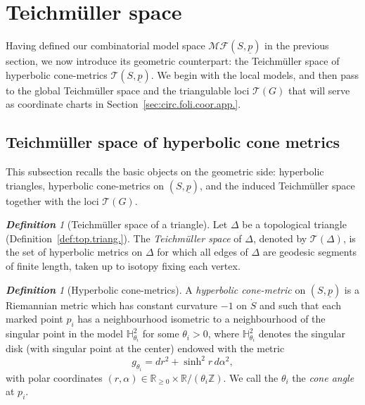 \documentclass[11pt, letterpaper]{amsart}
\theoremstyle{definition}
\theoremstyle{remark}
\newtheorem{definition}[theorem]{\rm\bf Definition}
\newcommand{\up}{\underline{p}}
\newcommand{\Sp}{(S,\up)}
\newcommand{\cMFp}{\mathcal{MF} (S,\up)}
\newcommand{\cT}{\mathcal{T}}
\newcommand{\cTp}{\mathcal{T} (S,\up)}
\newcommand{\bR}{\mathbb{R}}
\newcommand{\bH}{\mathbb{H}}
\newcommand{\DEF}{} \newcommand{\WARN}{\textcolor{red}} \newcommand{\ALT}{\textcolor{brown}} \newcommand{\TODO}{\textcolor{teal}} %
\numberwithin{equation}{section}
\begin{document}
 \section{Teichm\"uller space}
\label{sec:Teich.}

Having defined our combinatorial model space $\cMFp$ in the previous section, we now
introduce its geometric counterpart: the Teichm\"uller space of hyperbolic
cone-metrics $\cTp$.  We begin with the local models, and then pass to the global Teichm\"uller space and the triangulable loci
$\cT(G)$ that will serve as coordinate charts in Section~\ref{sec:circ.foli.coor.app.}.


\subsection{Teichm\"uller space of hyperbolic cone metrics}
\label{subsubsec:Teich.space.surf.}

This subsection recalls the basic objects on the geometric side: hyperbolic
triangles, hyperbolic cone-metrics on $(S,\up)$, and the induced Teichm\"uller
space together with the loci $\cT(G)$.

\begin{definition}[Teichm\"uller space of a triangle]
\label{def:Teich.of.hyp.triang.}
Let $\Delta$ be a topological triangle (Definition~\ref{def:top.triang.}). 
The \DEF{\em Teichm\"uller space} of $\Delta$, denoted by $\mathcal{T}(\Delta)$, is
the set of hyperbolic metrics on $\Delta$ for which all edges of $\Delta$ are
geodesic segments of finite length, taken up to isotopy fixing each vertex.
\end{definition}

\begin{definition}[Hyperbolic cone-metrics]
\label{def:tri-admis}
A \DEF{\em hyperbolic cone-metric} on $\Sp$ is a Riemannian metric which has
constant curvature $-1$ on $\dot S$ and such that each marked point $p_i$ has a
neighbourhood isometric to a neighbourhood of the singular point in the model
$\bH^2_{\theta_i}$ for some $\theta_i>0$, where $\bH^2_{\theta_i}$ denotes the
singular disk (with singular point at the center) endowed with the metric
\[
g_{\theta_i} = dr^2 + \sinh^2 r\,d\alpha^2,
\]
with polar coordinates $(r,\alpha) \in \bR_{\geq 0} \times \bR/(\theta_i\mathbb{Z})$.
We call the $\theta_i$ the \DEF{\em cone angle} at $p_i$.
\end{definition}
\end{document}
